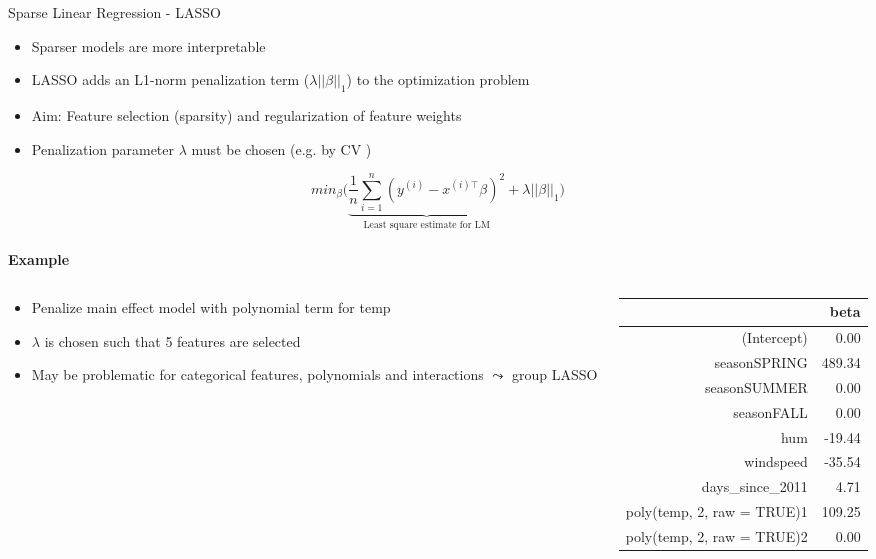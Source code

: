 \documentclass[11pt,compress,t,notes=noshow, aspectratio=169, xcolor=table]{beamer}
\begin{document}
\begin{frame}{Sparse Linear Regression - LASSO }
\begin{itemize}
    \item Sparser models are more interpretable
    \item LASSO adds an L1-norm penalization term  ($\lambda||\beta||_1$) to the optimization problem
    \item Aim: Feature selection (sparsity) and regularization of feature weights
    \item Penalization parameter $\lambda$ must be chosen (e.g. by CV %
    )
\end{itemize}


$$
min_{\beta} \bigg(\underbrace{\frac{1}{n} \sum_{i=1}^{n} (y^{(i)} - x^{(i)\top}\beta)^2}_\text{Least square estimate for LM} + \lambda||\beta||_1\bigg)
$$
\vspace*{0.2cm}\\
\textbf{Example}
\vspace*{-0.4cm}
\pause
\begin{columns}
\begin{column}{0.65\textwidth}
\begin{itemize}
    \item Penalize main effect model with polynomial term for temp
    \item $\lambda$ is chosen such that 5 features are selected
    \item May be problematic for categorical features, polynomials and interactions $\leadsto$ group LASSO 
\end{itemize}
\end{column}
\begin{column}{0.35\textwidth}
\tiny
\begin{table}[ht]
\centering
\begin{tabular}{rr}
  \hline
 & beta \\ 
  \hline
(Intercept) & 0.00 \\ 
  seasonSPRING & 489.34 \\ 
  seasonSUMMER & 0.00 \\ 
  seasonFALL & 0.00 \\ 
  hum & -19.44 \\ 
  windspeed & -35.54 \\ 
  days\_since\_2011 & 4.71 \\ 
  poly(temp, 2, raw = TRUE)1 & 109.25 \\ 
  poly(temp, 2, raw = TRUE)2 & 0.00 \\ 
   \hline
\end{tabular}
\end{table}
\end{column}
\end{columns}

\end{frame}
\end{document}

